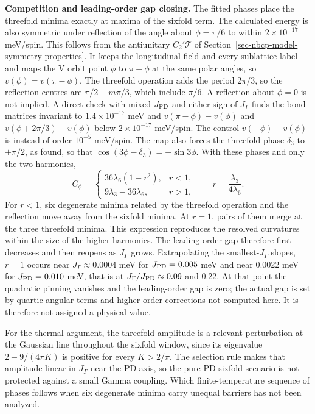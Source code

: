 \textbf{Competition and leading-order gap closing.} The fitted phases
place the threefold minima exactly at maxima of the sixfold term. The
calculated energy is also symmetric under reflection of the angle about
\(\phi=\pi/6\) to within \(2\times10^{-17}\) meV/spin. This follows from
the antiunitary \(C_2'\mathcal T\) of
Section~\ref{sec-nbcp-model-symmetry-properties}. It keeps the
longitudinal field and every sublattice label and maps the V orbit point
\(\phi\) to \(\pi-\phi\) at the same polar angles, so
\(v(\phi)=v(\pi-\phi)\). The threefold operation adds the period
\(2\pi/3\), so the reflection centres are \(\pi/2+m\pi/3\), which include
\(\pi/6\). A reflection about \(\phi=0\) is not implied. A direct check
with mixed \(J_{\rm PD}\) and either sign of \(J_\Gamma\) finds the bond
matrices invariant to \(1.4\times10^{-17}\) meV and
\(v(\pi-\phi)-v(\phi)\) and \(v(\phi+2\pi/3)-v(\phi)\) below
\(2\times10^{-17}\) meV/spin. The control \(v(-\phi)-v(\phi)\) is instead
of order \(10^{-5}\) meV/spin. The map also forces the threefold phase
\(\delta_3\) to \(\pm\pi/2\), as found, so that
\(\cos(3\phi-\delta_3)=\pm\sin3\phi\). With these phases and only the two
harmonics,
\begin{equation}\label{eq-nbcp-v-mixed-curvature}
C_\phi=\begin{cases}
36\lambda_6(1-r^2), & r<1,\\
9\lambda_3-36\lambda_6, & r>1,
\end{cases}
\qquad r=\frac{\lambda_3}{4\lambda_6}.
\end{equation}
For \(r<1\), six degenerate minima related by the threefold operation and
the reflection move away from the sixfold minima. At \(r=1\), pairs of
them merge at the three threefold minima. This expression reproduces the
resolved curvatures within the size of the higher harmonics. The
leading-order gap therefore first decreases and then reopens as
\(J_\Gamma\) grows. Extrapolating the smallest-\(J_\Gamma\) slopes, \(r=1\)
occurs near \(J_\Gamma\approx0.0004\) meV for \(J_{\rm PD}=0.005\) meV and
near 0.0022 meV for \(J_{\rm PD}=0.010\) meV, that is at
\(J_\Gamma/J_{\rm PD}\approx0.09\) and 0.22. At that point the quadratic
pinning vanishes and the leading-order gap is zero; the actual gap is set
by quartic angular terms and higher-order corrections not computed here.
It is therefore not assigned a physical value.

For the thermal argument, the threefold amplitude is a relevant
perturbation at the Gaussian line throughout the sixfold window, since
its eigenvalue \(2-9/(4\pi K)\) is positive for every \(K>2/\pi\). The
selection rule makes that amplitude linear in \(J_\Gamma\) near the PD
axis, so the pure-PD sixfold scenario is not protected against a small
Gamma coupling. Which finite-temperature sequence of phases follows when
six degenerate minima carry unequal barriers has not been analyzed.

